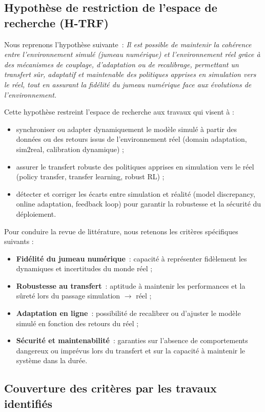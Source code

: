 \subsection*{Hypothèse de restriction de l’espace de recherche (H-TRF)}

Nous reprenons l’hypothèse suivante~: \textit{Il est possible de maintenir la cohérence entre l’environnement simulé (jumeau numérique) et l’environnement réel grâce à des mécanismes de couplage, d’adaptation ou de recalibrage, permettant un transfert sûr, adaptatif et maintenable des politiques apprises en simulation vers le réel, tout en assurant la fidélité du jumeau numérique face aux évolutions de l’environnement.}

Cette hypothèse restreint l’espace de recherche aux travaux qui visent à :
\begin{itemize}
  \item synchroniser ou adapter dynamiquement le modèle simulé à partir des données ou des retours issus de l’environnement réel (domain adaptation, sim2real, calibration dynamique) ;
  \item assurer le transfert robuste des politiques apprises en simulation vers le réel (policy transfer, transfer learning, robust RL) ;
  \item détecter et corriger les écarts entre simulation et réalité (model discrepancy, online adaptation, feedback loop) pour garantir la robustesse et la sécurité du déploiement.
\end{itemize}

Pour conduire la revue de littérature, nous retenons les critères spécifiques suivants :
\begin{itemize}
  \item \textbf{Fidélité du jumeau numérique}~: capacité à représenter fidèlement les dynamiques et incertitudes du monde réel ;
  \item \textbf{Robustesse au transfert}~: aptitude à maintenir les performances et la sûreté lors du passage simulation $\rightarrow$ réel ;
  \item \textbf{Adaptation en ligne}~: possibilité de recalibrer ou d’ajuster le modèle simulé en fonction des retours du réel ;
  \item \textbf{Sécurité et maintenabilité}~: garanties sur l’absence de comportements dangereux ou imprévus lors du transfert et sur la capacité à maintenir le système dans la durée.
\end{itemize}

\subsection*{Couverture des critères par les travaux identifiés}

